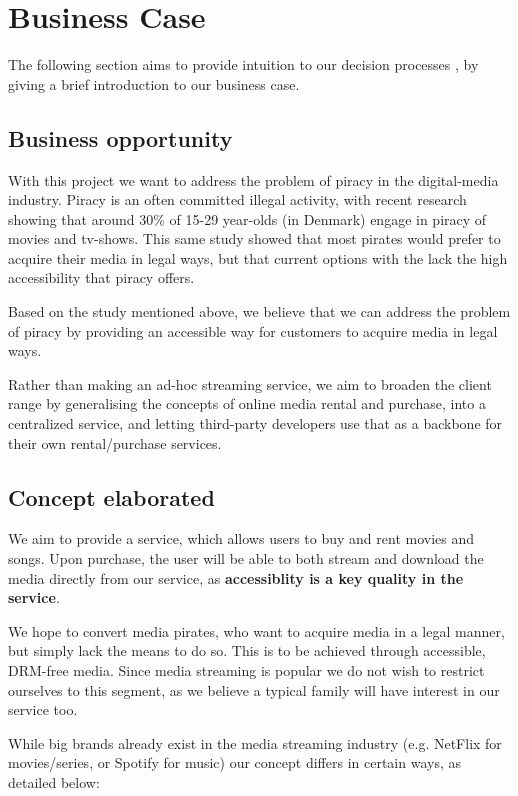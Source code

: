 \section{Business Case}
The following section aims to provide intuition to our decision processes
, by giving a brief introduction to our business case.

\subsection{Business opportunity}
With this project we want to address the problem of piracy in the digital-media
industry. Piracy is an often committed illegal activity, with recent research
showing that around 30\% of 15-29 year-olds (in Denmark) engage in piracy of
movies and tv-shows\cite{pirates}. This same study showed that most pirates
would prefer to acquire their media in legal ways, but that current options with
the lack the high accessibility that piracy offers.

Based on the study mentioned above, we believe that we can address the problem of
piracy by providing an accessible way for customers to acquire media in legal
ways.

Rather than making an ad-hoc streaming service, we aim to broaden the client
range by generalising the concepts of online media rental and purchase, into a
centralized service, and letting third-party developers use that as a backbone
for their own rental/purchase services.

\subsection{Concept elaborated}
We aim to provide a service, which allows users to buy and rent movies and songs. Upon purchase, the user will be able to both stream and download the media directly from our service, as \textbf{accessiblity is a key quality in the service}.

We hope to convert media pirates, who want to acquire media in a legal manner, but simply lack the means to do so. This is to be achieved through accessible, DRM-free media. Since media streaming is popular\cite{ott} we do not wish to restrict ourselves to this segment, as we believe a typical family will have interest in our service too.

While big brands already exist in the media streaming industry (e.g. NetFlix for movies/series, or Spotify for music) our concept differs in certain ways, as detailed below:

